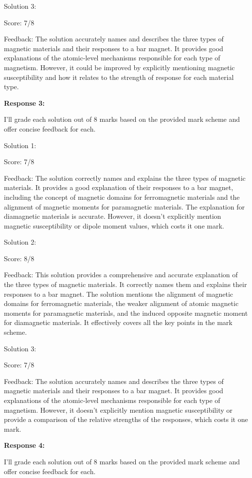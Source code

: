 \documentclass[a4paper,11pt]{article}
\begin{document}
Solution 3:

Score: 7/8

Feedback: The solution accurately names and describes the three types of magnetic materials and their responses to a bar magnet. It provides good explanations of the atomic-level mechanisms responsible for each type of magnetism. However, it could be improved by explicitly mentioning magnetic susceptibility and how it relates to the strength of response for each material type.

\bigskip
\textbf{Response 3:}

I'll grade each solution out of 8 marks based on the provided mark scheme and offer concise feedback for each.

Solution 1:

Score: 7/8

Feedback: The solution correctly names and explains the three types of magnetic materials. It provides a good explanation of their responses to a bar magnet, including the concept of magnetic domains for ferromagnetic materials and the alignment of magnetic moments for paramagnetic materials. The explanation for diamagnetic materials is accurate. However, it doesn't explicitly mention magnetic susceptibility or dipole moment values, which costs it one mark.

Solution 2:

Score: 8/8

Feedback: This solution provides a comprehensive and accurate explanation of the three types of magnetic materials. It correctly names them and explains their responses to a bar magnet. The solution mentions the alignment of magnetic domains for ferromagnetic materials, the weaker alignment of atomic magnetic moments for paramagnetic materials, and the induced opposite magnetic moment for diamagnetic materials. It effectively covers all the key points in the mark scheme.

Solution 3:

Score: 7/8

Feedback: The solution accurately names and describes the three types of magnetic materials and their responses to a bar magnet. It provides good explanations of the atomic-level mechanisms responsible for each type of magnetism. However, it doesn't explicitly mention magnetic susceptibility or provide a comparison of the relative strengths of the responses, which costs it one mark.

\bigskip
\textbf{Response 4:}

I'll grade each solution out of 8 marks based on the provided mark scheme and offer concise feedback for each.
\end{document}
